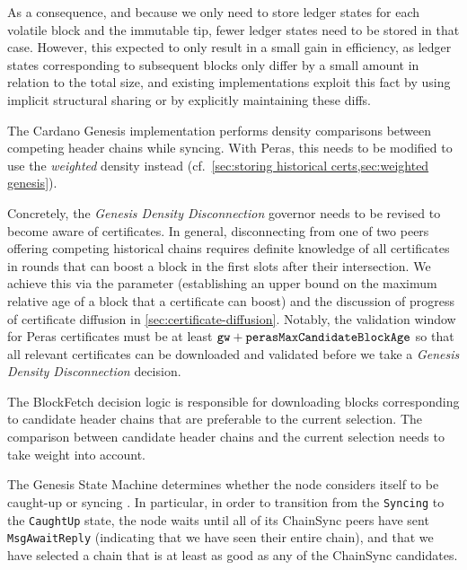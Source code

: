 \begin{description}
  As a consequence, and because we only need to store ledger states for each volatile block and the immutable tip, fewer ledger states need to be stored in that case.
  However, this expected to only result in a small gain in efficiency, as ledger states corresponding to subsequent blocks only differ by a small amount in relation to the total size, and existing implementations exploit this fact by using implicit structural sharing or by explicitly maintaining these diffs.
\item[Ouroboros Genesis rule]
  The Cardano Genesis implementation \parencite{genesis-implementation-documentation} performs density comparisons between competing header chains while syncing.
  With Peras, this needs to be modified to use the \emph{weighted} density instead (cf.~\cref{sec:storing historical certs,sec:weighted genesis}).

  Concretely, the \emph{Genesis Density Disconnection} governor needs to be revised to become aware of certificates.
  In general, disconnecting from one of two peers offering competing historical chains requires definite knowledge of all certificates in rounds that can boost a block in the first \sgen{} slots after their intersection.
  We achieve this via the \perasBlockMaxSlots{} parameter (establishing an upper bound on the maximum relative age of a block that a certificate can boost) and the discussion of progress of certificate diffusion in \cref{sec:certificate-diffusion}. Notably, the validation window for Peras certificates must be at least $\mathtt{gw} + \mathtt{perasMaxCandidateBlockAge}$ so that all relevant certificates can be downloaded and validated before we take a \emph{Genesis Density Disconnection} decision.
\item[BlockFetch decision logic]
  The BlockFetch decision logic is responsible for downloading blocks corresponding to candidate header chains that are preferable to the current selection.
  The comparison between candidate header chains and the current selection needs to take weight into account.
\item[Genesis State Machine]
  The Genesis State Machine determines whether the node considers itself to be caught-up or syncing \parencite{genesis-implementation-documentation}.
  In particular, in order to transition from the \texttt{Syncing} to the \texttt{CaughtUp} state, the node waits until all of its ChainSync peers have sent \texttt{MsgAwaitReply} (indicating that we have seen their entire chain), and that we have selected a chain that is at least as good as any of the ChainSync candidates.


\end{description}
